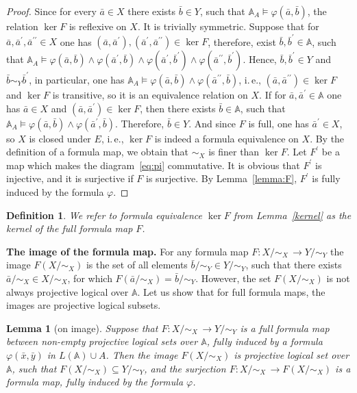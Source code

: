 \documentclass[12pt]{article}
\newtheorem{lemma}{Lemma}
\newtheorem{definition}{Definition}
\theoremstyle{definition}
\def\MA{{\mathbb{A}}}
\begin{document}
\begin{proof}
Since for every $\bar a\in X$ there exists $\bar b\in Y$, such that $\MA_A\models \varphi(\bar a,\bar b)$, the relation $\ker F$ is reflexive on $X$. It is trivially symmetric. Suppose that for $\bar a,\bar a^\prime, \bar a^{\prime\prime}\in X$ one has $(\bar a,\bar a^\prime), (\bar a^\prime,\bar a^{\prime\prime})\in \ker F$, therefore, exist $\bar b,\bar b^\prime\in \MA$, such that $\MA_A\models \varphi(\bar a,\bar b)\wedge \varphi(\bar a^\prime,\bar b)\wedge \varphi(\bar a^\prime,\bar b^\prime)\wedge \varphi(\bar a^{\prime\prime},\bar b^{\prime})$. Hence, $\bar b,\bar b^\prime\in Y$ and $\bar b\sim_Y \bar b^\prime$, in particular, one has $\MA_A\models \varphi(\bar a,\bar b)\wedge\varphi(\bar a^{\prime\prime},\bar b)$, i.\,e., $(\bar a,\bar a^{\prime\prime})\in\ker F$ and $\ker F$ is transitive, so it is an equivalence relation on $X$. If for $\bar a,\bar a^\prime\in \MA$ one has $\bar a\in X$ and $(\bar a,\bar a^\prime)\in\ker F$, then there exists $\bar b\in \MA$, such that $\MA_A\models \varphi(\bar a,\bar b)\wedge \varphi(\bar a^\prime,\bar b)$. Therefore, $\bar b\in Y$. And since $F$ is full, one has $\bar a^\prime\in X$, so $X$ is closed under $E$, i.\,e., $\ker F$ is indeed a formula equivalence on $X$. By the definition of a formula map, we obtain that $\sim_X$ is finer than $\ker F$. Let $F^\prime$ be a map which makes the diagram~\eqref{eq:pi} commutative. It is obvious that $F^\prime$ is injective, and it is surjective if $F$ is surjective. By Lemma~\ref{lemma:F}, $F^\prime$ is fully induced by the formula $\varphi$.
\end{proof}

\begin{definition}
We refer to formula equivalence $\ker F$ from Lemma~\ref{kernel} as the {\em kernel} of the full formula map $F$.
\end{definition}

{\bf The image of the formula map.} 
For any formula map $F\colon X/{\sim_X} \,\to Y/{\sim_Y}$ the image $F(X/{\sim_X})$ is the set of all elements $\bar b/{\sim_Y}\in Y/{\sim_Y}$, such that there exists $\bar a/{\sim_X}\in X/{\sim_X}$, for which $F(\bar a/{\sim_X})=\bar b/{\sim_Y}$. However, the set $F(X/{\sim_X})$ is not always projective logical over $\MA$. Let us show that for full formula maps, the images are projective logical subsets.

\begin{lemma}[on image]\label{image}
Suppose that $F\colon X/{\sim_X} \,\to Y/{\sim_Y}$ is a full formula map between non-empty projective logical sets over $\MA$, fully induced by a formula $\varphi(\bar x,\bar y)$ in $L(\MA)\cup A$. Then the image $F(X/{\sim_X})$ is projective logical set over $\MA$, such that $F(X/{\sim_X})\subseteq Y/{\sim_Y}$, and the surjection $F\colon X/{\sim_X} \,\to F(X/{\sim_X})$ is a formula map, fully induced by the formula $\varphi$. 
\end{lemma}
\end{document}
